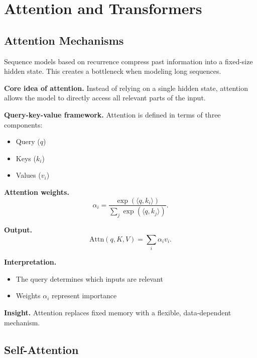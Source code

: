 \chapter{Attention and Transformers}

\section{Attention Mechanisms}

Sequence models based on recurrence compress past information into a fixed-size hidden state. This creates a bottleneck when modeling long sequences.

\medskip

\noindent
\textbf{Core idea of attention.}  
Instead of relying on a single hidden state, attention allows the model to directly access all relevant parts of the input.

\medskip

\noindent
\textbf{Query-key-value framework.}  
Attention is defined in terms of three components:
\begin{itemize}
    \item Query ($q$)
    \item Keys ($k_i$)
    \item Values ($v_i$)
\end{itemize}

\medskip

\noindent
\textbf{Attention weights.}
\[
\alpha_i = \frac{\exp(\langle q, k_i \rangle)}{\sum_j \exp(\langle q, k_j \rangle)}.
\]

\medskip

\noindent
\textbf{Output.}
\[
\mathrm{Attn}(q, K, V) = \sum_i \alpha_i v_i.
\]

\medskip

\noindent
\textbf{Interpretation.}
\begin{itemize}
    \item The query determines which inputs are relevant
    \item Weights $\alpha_i$ represent importance
\end{itemize}

\medskip

\noindent
\textbf{Insight.}  
Attention replaces fixed memory with a flexible, data-dependent mechanism.

\section{Self-Attention}

